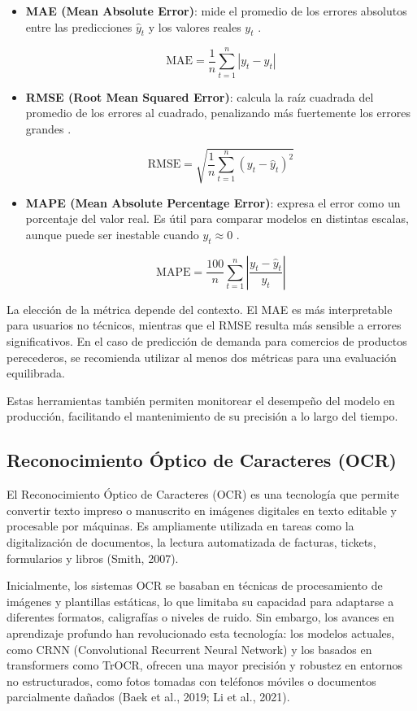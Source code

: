 \begin{itemize}
    \item \textbf{MAE (Mean Absolute Error)}: mide el promedio de los errores absolutos entre las predicciones $\hat{y}_t$ y los valores reales $y_t$ \parencite{willmott2005}.
    
    \[
        \text{MAE} = \frac{1}{n} \sum_{t=1}^{n} \left| y_t - \hat{y}_t \right|
    \]

    \item \textbf{RMSE (Root Mean Squared Error)}: calcula la raíz cuadrada del promedio de los errores al cuadrado, penalizando más fuertemente los errores grandes \parencite{chai2014}.
    
    \[
        \text{RMSE} = \sqrt{ \frac{1}{n} \sum_{t=1}^{n} \left( y_t - \hat{y}_t \right)^2 }
    \]

    \item \textbf{MAPE (Mean Absolute Percentage Error)}: expresa el error como un porcentaje del valor real. Es útil para comparar modelos en distintas escalas, aunque puede ser inestable cuando $y_t \approx 0$ \parencite{myttenaere2016}.
    
    \[
        \text{MAPE} = \frac{100}{n} \sum_{t=1}^{n} \left| \frac{y_t - \hat{y}_t}{y_t} \right|
    \]
\end{itemize}

La elección de la métrica depende del contexto. El MAE es más interpretable para usuarios no técnicos, mientras que el RMSE resulta más sensible a errores significativos. En el caso de predicción de demanda para comercios de productos perecederos, se recomienda utilizar al menos dos métricas para una evaluación equilibrada.

Estas herramientas también permiten monitorear el desempeño del modelo en producción, facilitando el mantenimiento de su precisión a lo largo del tiempo.

\subsection{Reconocimiento Óptico de Caracteres (OCR)}

\indent El Reconocimiento Óptico de Caracteres (OCR) es una tecnología que permite convertir texto impreso o manuscrito en imágenes digitales en texto editable y procesable por máquinas. Es ampliamente utilizada en tareas como la digitalización de documentos, la lectura automatizada de facturas, tickets, formularios y libros (Smith, 2007).

\indent Inicialmente, los sistemas OCR se basaban en técnicas de procesamiento de imágenes y plantillas estáticas, lo que limitaba su capacidad para adaptarse a diferentes formatos, caligrafías o niveles de ruido. Sin embargo, los avances en aprendizaje profundo han revolucionado esta tecnología: los modelos actuales, como CRNN (Convolutional Recurrent Neural Network) y los basados en transformers como TrOCR, ofrecen una mayor precisión y robustez en entornos no estructurados, como fotos tomadas con teléfonos móviles o documentos parcialmente dañados (Baek et al., 2019; Li et al., 2021).


